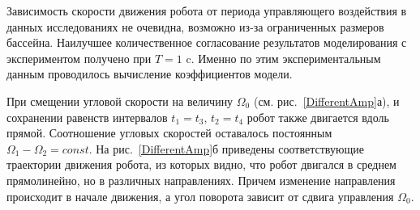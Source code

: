 %




Зависимость скорости движения робота от периода управляющего воздействия в данных исследованиях не очевидна, возможно из-за ограниченных размеров бассейна. Наилучшее количественное согласование результатов моделирования с экспериментом получено при $T = 1$ c. Именно по этим экспериментальным данным проводилось вычисление коэффициентов модели. 

При смещении угловой скорости на величину $\Omega_0$ (см. рис.~\ref{DifferentAmp}а), и сохранении равенств интервалов $t_1=t_3$, $t_2=t_4$  робот также двигается вдоль прямой.  Соотношение угловых скоростей оставалось постоянным $ \Omega_1 - \Omega_2 = const$.  На рис.~\ref{DifferentAmp}б приведены соответствующие траектории движения робота, из которых видно, что робот двигался в среднем прямолинейно, но в различных направлениях. Причем изменение направления происходит в начале движения, а угол поворота зависит от сдвига управления $\Omega_0$. 


